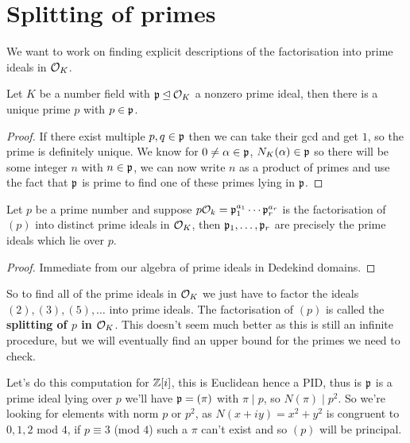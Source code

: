 \documentclass{article}
\begin{document}
\section{Splitting of primes}

We want to work on finding explicit descriptions of the factorisation into prime ideals in $\mathcal{O}_K$.

\begin{lemma}
    Let $K$ be a number field with $\mathfrak{p}\unlhd \mathcal{O}_K$ a nonzero prime ideal, then there is a unique prime $p$ with $p\in\mathfrak{p}$.\begin{proof}
        If there exist multiple $p,q\in\mathfrak{p}$ then we can take their gcd and get $1$, so the prime is definitely unique. We know for $0\neq \alpha\in \mathfrak{p}$, $N_K(\alpha)\in \mathfrak{p}$ so there will be some integer $n$ with $n\in\mathfrak{p}$, we can now write $n$ as a product of primes and use the fact that $\mathfrak{p}$ is prime to find one of these primes lying in $\mathfrak{p}$.
    \end{proof}
\end{lemma}

\begin{proposition}
    Let $p$ be a prime number and suppose $p\mathcal{O}_k=\mathfrak{p}_1^{a_1}\cdots \mathfrak{p}_r^{a_r}$ is the factorisation of $(p)$ into distinct prime ideals in $\mathcal{O}_K$, then $\mathfrak{p}_1,\ldots,\mathfrak{p}_r$ are precisely the prime ideals which lie over $p$.\begin{proof}
        Immediate from our algebra of prime ideals in Dedekind domains.
    \end{proof}
\end{proposition}

So to find all of the prime ideals in $\mathcal{O}_K$ we just have to factor the ideals $(2),(3),(5),\ldots$ into prime ideals. The factorisation of $(p)$ is called the \textbf{splitting of $p$ in $\mathcal{O}_K$}. This doesn't seem much better as this is still an infinite procedure, but we will eventually find an upper bound for the primes we need to check.

Let's do this computation for $\mathbb{Z}[i]$, this is Euclidean hence a PID, thus is $\mathfrak{p}$ is a prime ideal lying over $p$ we'll have $\mathfrak{p}=(\pi)$ with $\pi\mid p$, so $N(\pi)\mid p^2$. So we're looking for elements with norm $p$ or $p^2$, as $N(x+iy)=x^2+y^2$ is congruent to $0,1,2$ mod $4$, if $p\equiv 3$ (mod $4$) such a $\pi$ can't exist and so $(p)$ will be principal.
\end{document}
